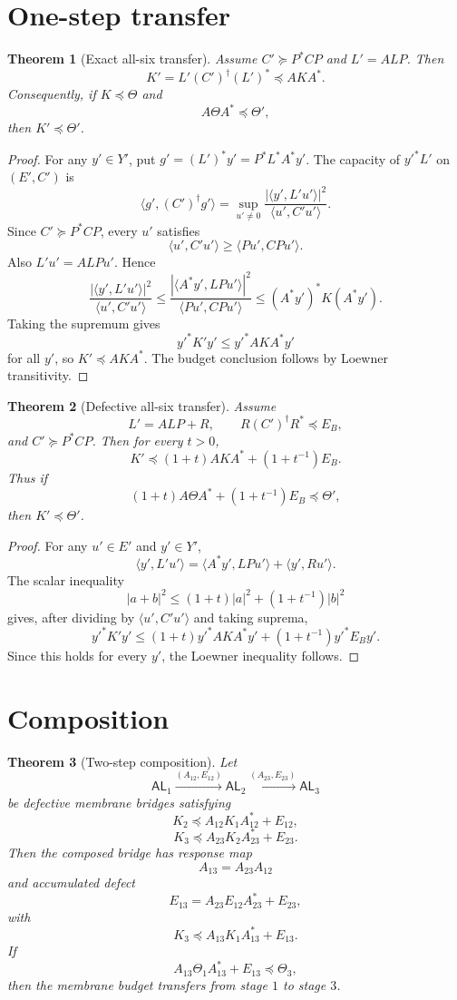 \documentclass[11pt]{article}
\newtheorem{theorem}{Theorem}
\begin{document}
\section{One-step transfer}

\begin{theorem}[Exact all-six transfer]
Assume $C'\succeq P^*CP$ and $L'=ALP$. Then
\[
K'=L'(C')^\dagger(L')^*\preceq A K A^*.
\]
Consequently, if $K\preceq\Theta$ and
\[
A\Theta A^*\preceq\Theta',
\]
then $K'\preceq\Theta'$.
\end{theorem}

\begin{proof}
For any $y'\in Y'$, put $g'=(L')^*y'=P^*L^*A^*y'$. The capacity of $y'^*L'$ on $(E',C')$ is
\[
\langle g',(C')^\dagger g'\rangle
=
\sup_{u'\ne0}\frac{|\langle y',L'u'\rangle|^2}{\langle u',C'u'\rangle}.
\]
Since $C'\succeq P^*CP$, every $u'$ satisfies
\[
\langle u',C'u'\rangle\ge \langle Pu',CPu'\rangle.
\]
Also $L'u'=ALPu'$. Hence
\[
\frac{|\langle y',L'u'\rangle|^2}{\langle u',C'u'\rangle}
\le
\frac{|\langle A^*y',LPu'\rangle|^2}{\langle Pu',CPu'\rangle}
\le
(A^*y')^*K(A^*y').
\]
Taking the supremum gives
\[
y'^*K'y'\le y'^*AKA^*y'
\]
for all $y'$, so $K'\preceq AKA^*$. The budget conclusion follows by Loewner transitivity.
\end{proof}

\begin{theorem}[Defective all-six transfer]
Assume
\[
L'=ALP+R,
\qquad
R(C')^\dagger R^*\preceq E_B,
\]
and $C'\succeq P^*CP$. Then for every $t>0$,
\[
\boxed{
K'\preceq (1+t)AKA^*+(1+t^{-1})E_B.
}
\]
Thus if
\[
(1+t)A\Theta A^*+(1+t^{-1})E_B\preceq\Theta',
\]
then $K'\preceq\Theta'$.
\end{theorem}

\begin{proof}
For any $u'\in E'$ and $y'\in Y'$,
\[
\langle y',L'u'\rangle
=
\langle A^*y',LPu'\rangle+
\langle y',Ru'\rangle.
\]
The scalar inequality
\[
|a+b|^2\le(1+t)|a|^2+(1+t^{-1})|b|^2
\]
gives, after dividing by $\langle u',C'u'\rangle$ and taking suprema,
\[
y'^*K'y'\le (1+t)y'^*AKA^*y'+(1+t^{-1})y'^*E_By'.
\]
Since this holds for every $y'$, the Loewner inequality follows.
\end{proof}

\section{Composition}

\begin{theorem}[Two-step composition]
Let
\[
\mathsf{AL}_1\xrightarrow{(A_{12},E_{12})}\mathsf{AL}_2
\xrightarrow{(A_{23},E_{23})}\mathsf{AL}_3
\]
be defective membrane bridges satisfying
\[
K_2\preceq A_{12}K_1A_{12}^*+E_{12},
\]
\[
K_3\preceq A_{23}K_2A_{23}^*+E_{23}.
\]
Then the composed bridge has response map
\[
A_{13}=A_{23}A_{12}
\]
and accumulated defect
\[
E_{13}=A_{23}E_{12}A_{23}^*+E_{23},
\]
with
\[
\boxed{
K_3\preceq A_{13}K_1A_{13}^*+E_{13}.
}
\]
If
\[
A_{13}\Theta_1A_{13}^*+E_{13}\preceq \Theta_3,
\]
then the membrane budget transfers from stage $1$ to stage $3$.
\end{theorem}
\end{document}
